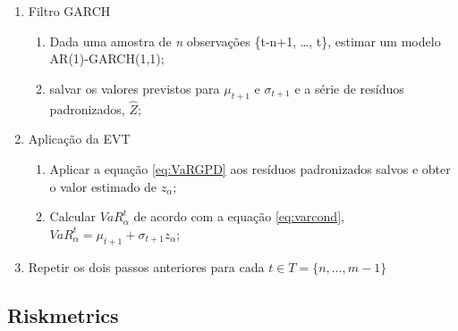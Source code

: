 \documentclass[1p]{elsarticle}
\theoremstyle{definition}
\begin{document}
\begin{enumerate}
	\item Filtro GARCH
	\begin{enumerate}[label*=\arabic*.]
		\item Dada uma amostra de \emph{n} observações \{t-n+1, \ldots, t\}, estimar um modelo AR(1)-GARCH(1,1);
		\item salvar os valores previstos para $\mu_{t+1}$ e $\sigma_{t+1}$ e a série de resíduos padronizados, $\hat{Z}$;
	\end{enumerate}

	\item Aplicação da EVT
	\begin{enumerate}[label*=\arabic*.]
		\item Aplicar a equação \eqref{eq:VaRGPD} aos resíduos padronizados salvos e obter o valor estimado de $z_\alpha$;
		\item Calcular $VaR^t_\alpha$ de acordo com a equação \eqref{eq:varcond}, $VaR_\alpha^t=\mu_{t+1}+\sigma_{t+1}z_\alpha$;
	\end{enumerate}
	\item Repetir os dois passos anteriores para cada $t \in T = \{n, \ldots, m-1\}$
\end{enumerate}

%
%
%

\subsection{Riskmetrics}
\label{sec:appendix_riskmetrics}
\end{document}
